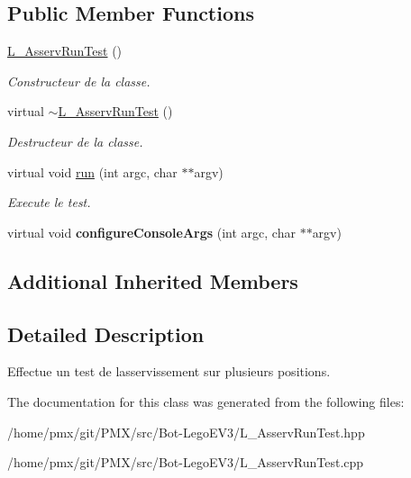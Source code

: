 \subsection*{Public Member Functions}
\begin{DoxyCompactItemize}
\item 
\mbox{\label{classL__AsservRunTest_a8203249e815d5a9d085cbed769be8b09}} 
\hyperlink{classL__AsservRunTest_a8203249e815d5a9d085cbed769be8b09}{L\+\_\+\+Asserv\+Run\+Test} ()
\begin{DoxyCompactList}\small\item\em Constructeur de la classe. \end{DoxyCompactList}\item 
\mbox{\label{classL__AsservRunTest_a58769086f4ae8f9eecedc3cd3cf74650}} 
virtual \hyperlink{classL__AsservRunTest_a58769086f4ae8f9eecedc3cd3cf74650}{$\sim$\+L\+\_\+\+Asserv\+Run\+Test} ()
\begin{DoxyCompactList}\small\item\em Destructeur de la classe. \end{DoxyCompactList}\item 
\mbox{\label{classL__AsservRunTest_a72f0bd680ef18d02eb866811eaa3d43f}} 
virtual void \hyperlink{classL__AsservRunTest_a72f0bd680ef18d02eb866811eaa3d43f}{run} (int argc, char $\ast$$\ast$argv)
\begin{DoxyCompactList}\small\item\em Execute le test. \end{DoxyCompactList}\item 
\mbox{\label{classL__AsservRunTest_a3f94160e793201619ed5b26a4b298a95}} 
virtual void {\bfseries configure\+Console\+Args} (int argc, char $\ast$$\ast$argv)
\end{DoxyCompactItemize}
\subsection*{Additional Inherited Members}


\subsection{Detailed Description}
Effectue un test de l\textquotesingle{}asservissement sur plusieurs positions. 

The documentation for this class was generated from the following files\+:\begin{DoxyCompactItemize}
\item 
/home/pmx/git/\+P\+M\+X/src/\+Bot-\/\+Lego\+E\+V3/L\+\_\+\+Asserv\+Run\+Test.\+hpp\item 
/home/pmx/git/\+P\+M\+X/src/\+Bot-\/\+Lego\+E\+V3/L\+\_\+\+Asserv\+Run\+Test.\+cpp\end{DoxyCompactItemize}
